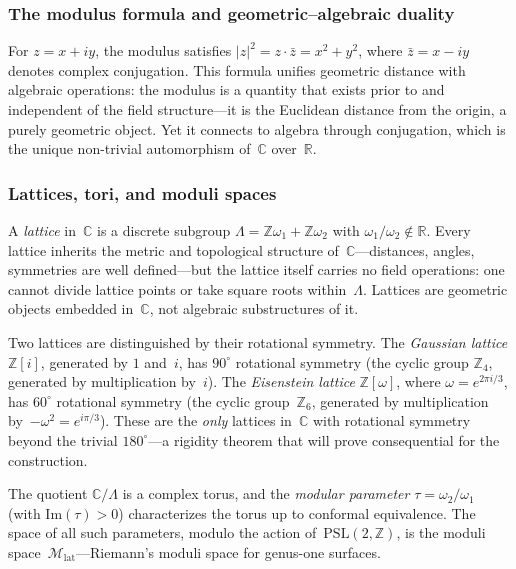 \subsubsection{The modulus formula and geometric--algebraic duality}

For $z = x + iy$, the modulus satisfies
$|z|^2 = z \cdot \bar{z} = x^2 + y^2$, where
$\bar{z} = x - iy$ denotes complex conjugation.  This formula unifies
geometric distance with algebraic operations: the modulus is a
quantity that exists prior to and independent of the field
structure---it is the Euclidean distance from the origin, a purely
geometric object.  Yet it connects to algebra through conjugation,
which is the unique non-trivial automorphism of~$\mathbb{C}$
over~$\mathbb{R}$.

\subsubsection{Lattices, tori, and moduli spaces}

A \emph{lattice} in~$\mathbb{C}$ is a discrete subgroup
$\Lambda = \mathbb{Z}\omega_1 + \mathbb{Z}\omega_2$ with
$\omega_1/\omega_2 \notin \mathbb{R}$.  Every lattice inherits the
metric and topological structure of~$\mathbb{C}$---distances, angles,
symmetries are well defined---but the lattice itself carries no field
operations: one cannot divide lattice points or take square roots
within~$\Lambda$.  Lattices are geometric objects embedded
in~$\mathbb{C}$, not algebraic substructures of it.

Two lattices are distinguished by their rotational symmetry.
The \emph{Gaussian lattice} $\mathbb{Z}[i]$, generated by $1$
and~$i$, has $90^\circ$ rotational symmetry (the cyclic group
$\mathbb{Z}_4$, generated by multiplication by~$i$).  The
\emph{Eisenstein lattice} $\mathbb{Z}[\omega]$, where
$\omega = e^{2\pi i/3}$, has $60^\circ$ rotational symmetry (the
cyclic group~$\mathbb{Z}_6$, generated by multiplication
by~$-\omega^2 = e^{i\pi/3}$).
These are the \emph{only} lattices in~$\mathbb{C}$ with rotational
symmetry beyond the trivial $180^\circ$---a rigidity theorem that will
prove consequential for the construction.

The quotient $\mathbb{C}/\Lambda$ is a complex torus, and the
\emph{modular parameter} $\tau = \omega_2/\omega_1$ (with
$\mathrm{Im}(\tau) > 0$) characterizes the torus up to conformal
equivalence.  The space of all such parameters, modulo the action
of~$\mathrm{PSL}(2,\mathbb{Z})$, is the moduli
space~$\mathcal{M}_{\mathrm{lat}}$---Riemann's moduli space for
genus-one surfaces.


